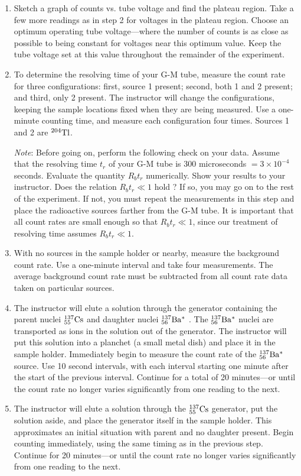 \documentclass{article}
\newcommand{\cs}{${}^{137}_{55}{\rm Cs}$ }
\newcommand{\bam}{${}^{137}_{56}{\rm Ba^* }$ }
\begin{document}
\begin{enumerate}
\item Sketch a graph of counts vs. tube voltage and find the
plateau region.  Take a few more readings as in step 2 for voltages in
the plateau region.  Choose an optimum operating tube voltage---where
the number of counts is as close as possible to being constant for
voltages near this optimum value. Keep the tube voltage set at this
value throughout the remainder of the experiment.

\item To determine the resolving time of your G-M tube, measure the count
rate for three configurations: first, source 1 present; second, both 1
and 2 present; and third, only 2 present.  The instructor will change
the configurations, keeping the sample locations fixed when they are
being measured.  Use a one-minute counting time, and measure each
configuration four times.  Sources 1 and 2 are ${}^{204}{\rm Tl}$.

{\em Note}: Before going on, perform the following check on your data.
Assume that the resolving time $t_{r}$ of your G-M tube is
300 microseconds $ = 3 \times 10^{-4}$ seconds.  Evaluate the
quantity $R_{b} t_{r}$ numerically. Show your results
to your instructor. Does the relation
$ R_{b} t_{r} \ll 1$ hold ?
If so, you may go on to the rest of the experiment.  If not, you
must repeat the measurements in this step and place the radioactive
sources farther from the G-M tube.  It is important that all count
rates are small enough so that $R_{b}t_{r} \ll 1$, since our treatment of resolving time
assumes $R_{b}t_{r} \ll 1$.

\item With no sources in the sample holder or nearby, measure the
background count rate.  Use a one-minute interval and take four
measurements.  The average background count rate must be subtracted
from all count rate data taken on particular sources.

\item The instructor will elute a solution through the generator
containing the parent nuclei \cs and daughter nuclei \bam.  The
\bam nuclei are transported as ions in the solution out of the
generator.  The instructor will put this solution into a planchet (a
small metal dish) and place it in the sample holder.  Immediately
begin to measure the count rate of the \bam source.  Use 10 second
intervals, with each interval starting one
minute after the start of the previous interval.  Continue for a total
of 20 minutes---or until the count rate no longer varies significantly
from one reading to the next. 

\item The instructor will elute a solution through the \cs generator,
put the solution aside, and place the generator itself in the sample
holder. This approximates an initial situation with parent and no
daughter present. Begin counting immediately, using the same timing as
in the previous step.  Continue for 20 minutes---or until the count
rate no longer varies significantly from one reading to the next.
\end{enumerate}
\end{document}
